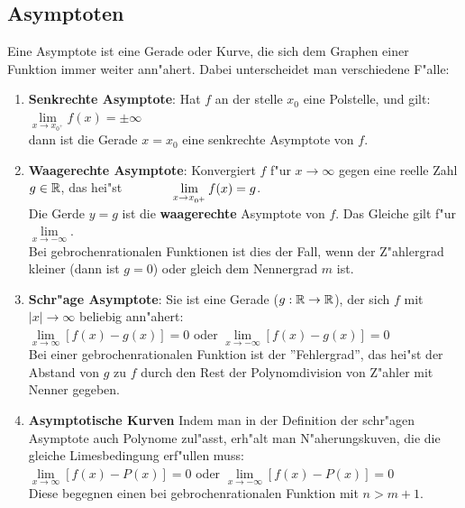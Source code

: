 \subsection{Asymptoten}

Eine Asymptote ist eine Gerade oder Kurve, die sich dem Graphen einer Funktion immer weiter ann"ahert. Dabei unterscheidet man verschiedene F"alle:\\
\begin{Definition}
\begin{enumerate}
\item \textbf{Senkrechte Asymptote}: Hat $f$ an der stelle $x_{0}$ eine Polstelle, und gilt:\\
\indent \qquad $\lim\limits_{x \rightarrow x_{0^{+}}} f(x) = \pm \infty$\\
dann ist die Gerade $x=x_{0}$ eine senkrechte Asymptote von $f$.\\
\item \textbf{Waagerechte Asymptote}: Konvergiert $f$ f"ur $x\rightarrow \infty$ gegen eine reelle Zahl $g\in \mathbb{R}$, das hei"st $\indent \qquad\lim\limits_{x \rightarrow x_{0^{+}}}{f(x)}=g$.\\
Die Gerde $y=g$ ist die \textbf{waagerechte} Asymptote von $f$. Das Gleiche gilt f"ur $\lim\limits_{x \rightarrow -\infty}$.\\
Bei gebrochenrationalen Funktionen ist dies der Fall, wenn der Z"ahlergrad kleiner (dann ist $g=0$) oder gleich dem Nennergrad $m$ ist.\\
\item \textbf{Schr"age Asymptote}: Sie ist eine Gerade ($g:\mathbb{R} \rightarrow \mathbb{R}$), der sich $f$ mit $|x|\rightarrow \infty$ beliebig ann"ahert:\\
\indent \qquad$\lim\limits_{x \rightarrow \infty}{[f(x)-g(x)]}=0$ oder $\lim\limits_{x \rightarrow -\infty}{[f(x)-g(x)]}=0$\\
Bei einer gebrochenrationalen Funktion ist der ''Fehlergrad'', das hei"st der Abstand von $g$ zu $f$ durch den Rest der Polynomdivision von Z"ahler mit Nenner gegeben.\\
\item \textbf{Asymptotische Kurven} Indem man in der Definition der schr"agen Asymptote auch Polynome zul"asst, erh"alt man N"aherungskuven, die die gleiche Limesbedingung erf"ullen muss:\\
\indent \qquad$\lim\limits_{x \rightarrow \infty}{[f(x)-P(x)]}=0$ oder $\lim\limits_{x \rightarrow -\infty}{[f(x)-P(x)]}=0$\\
Diese begegnen einen bei gebrochenrationalen Funktion mit $n>m+1$.\\
\end{enumerate}
\end{Definition}

